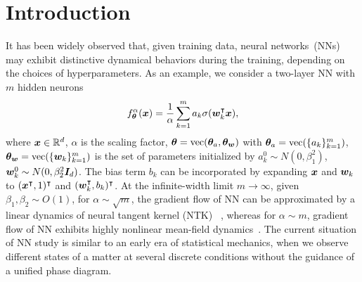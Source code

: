 \documentclass{article}
\begin{document}
\begin{abstract}
\end{abstract}

\section{Introduction}

It has been widely observed that, given training data, neural networks~(NNs) may exhibit distinctive dynamical behaviors during the training, depending on the choices of hyperparameters. As an example, we consider a two-layer NN with $m$  hidden neurons
\begin{equation}\label{eq: 2LNN}
    f^{\alpha}_{\bm{\theta}}(\bm{x}) = \frac{1}{\alpha}\sum_{k=1}^{m}a_k\sigma(\bm{w}_k^{\intercal}\bm{x}),
\end{equation}
where $\bm{x}\in\mathbb{R}^{d}$, $\alpha$ is the scaling factor, $\bm{\theta}=\mathrm{vec}(\bm{\theta}_a,\bm{\theta}_{\bm{w}})$ with $\bm{\theta}_a=\mathrm{vec}(\{a_k\}_{k=1}^{m})$, $\bm{\theta}_{\bm{w}}=\mathrm{vec}(\{\bm{w}_k\}_{k=1}^{m})$ is the set of parameters initialized by $a_k^0\sim N(0, \beta_1^2)$, $\bm{w}_k^0\sim N(0, \beta_2^2 \bm{I}_d)$. The bias term $b_k$ can be incorporated by expanding $\bm{x}$ and $\bm{w}_k$ to $(\bm{x}^\intercal,1)^\intercal$ and $(\bm{w}_k^\intercal,b_k)^\intercal$. At the infinite-width limit $m\to\infty$, given $\beta_{1},\beta_{2}\sim O(1)$, for $\alpha\sim\sqrt{m}$, the gradient flow of NN can be approximated by a linear dynamics of neural tangent kernel (NTK) ~\cite{jacot_neural_2018,arora2019exact,zhang_type_2019}, whereas for $\alpha\sim m$, gradient flow of NN exhibits highly nonlinear mean-field dynamics~\cite{mei_mean_2018,rotskoff_parameters_2018,chizat_global_2018,sirignano_mean_2020}. The current situation of NN study is similar to an early era of statistical mechanics, when we observe different states of a matter at several discrete conditions without the guidance of a unified phase diagram.
\end{document}
